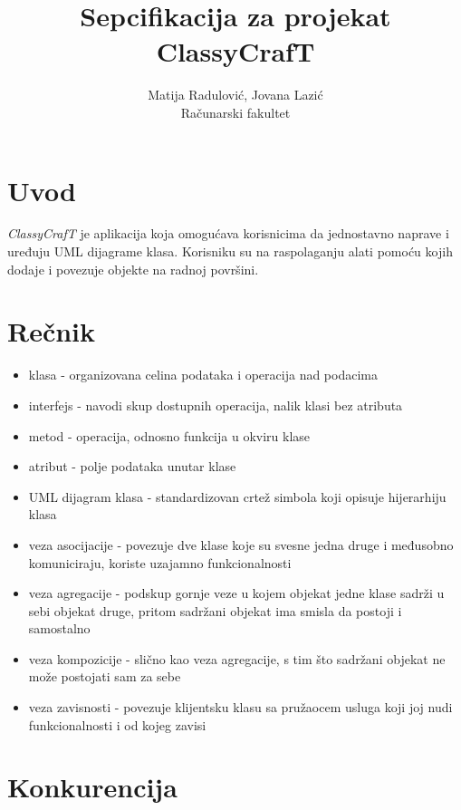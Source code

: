 \documentclass[a4paper]{article}
\begin{document}
\title{Sepcifikacija za projekat ClassyCrafT}


\author{Matija Radulović, Jovana Lazić\\
\small Računarski fakultet}
\maketitle


\section{Uvod}
\textit{ClassyCrafT} je aplikacija koja omogućava korisnicima da jednostavno naprave i uređuju UML dijagrame klasa. Korisniku su na raspolaganju alati pomoću kojih dodaje i povezuje objekte na radnoj površini. 

\section{Rečnik}
\begin{itemize}
    \item klasa - organizovana celina podataka i operacija nad podacima
    \item interfejs - navodi skup dostupnih operacija, nalik klasi bez atributa
    \item metod - operacija, odnosno funkcija u okviru klase
    \item atribut - polje podataka unutar klase
    \item UML dijagram klasa - standardizovan crtež simbola koji opisuje hijerarhiju klasa
    \item veza asocijacije - povezuje dve klase koje su svesne jedna druge i međusobno komuniciraju, koriste uzajamno funkcionalnosti
    \item veza agregacije - podskup gornje veze u kojem objekat jedne klase sadrži u sebi objekat druge, pritom sadržani objekat ima smisla da postoji i samostalno
    \item veza kompozicije - slično kao veza agregacije, s tim što sadržani objekat ne može postojati sam za sebe
    \item veza zavisnosti - povezuje klijentsku klasu sa pružaocem usluga koji joj nudi funkcionalnosti i od kojeg zavisi
\end{itemize}

\section{Konkurencija}
\end{document}
